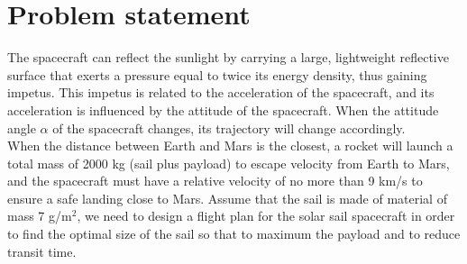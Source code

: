 \documentclass[../Paper.tex]{subfiles}
\begin{document}
\section{Problem statement}

The spacecraft can reflect the sunlight by carrying a large, lightweight reflective surface that exerts a pressure equal to twice its energy density, thus gaining impetus. This impetus is related to the acceleration of the spacecraft, and its acceleration is influenced by the attitude of the spacecraft. When the attitude angle $\alpha$ of the spacecraft changes, its trajectory will change accordingly. 
\\

When the distance between Earth and Mars is the closest, a rocket will launch a total mass of 2000 kg (sail plus payload) to escape velocity from Earth to Mars, and the spacecraft must have a relative velocity of no more than 9 km/s to ensure a safe landing close to Mars. Assume that the sail is made of material of mass 7 g/m$^2$, we need to design a flight plan for the solar sail spacecraft in order to find the optimal size of the sail so that to maximum the payload and to reduce transit time.
\end{document}
